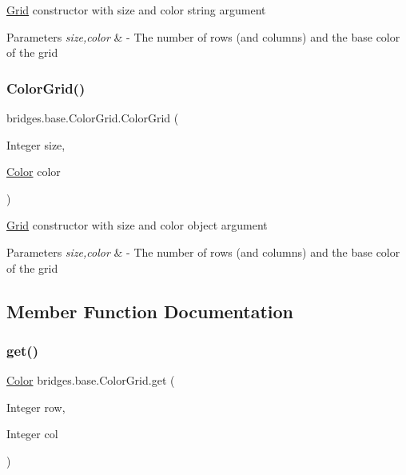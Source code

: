 \mbox{\hyperlink{classbridges_1_1base_1_1_grid}{Grid}} constructor with size and color string argument


\begin{DoxyParams}{Parameters}
{\em size,color} & -\/ The number of rows (and columns) and the base color of the grid \\
\hline
\end{DoxyParams}
\mbox{\label{classbridges_1_1base_1_1_color_grid_a51e4fd5e2b0d1c467d5eaf6860b5264a}} 
\subsubsection{\texorpdfstring{Color\+Grid()}{ColorGrid()}\hspace{0.1cm}{\footnotesize\ttfamily [5/5]}}
{\footnotesize\ttfamily bridges.\+base.\+Color\+Grid.\+Color\+Grid (\begin{DoxyParamCaption}\item[{Integer}]{size,  }\item[{\mbox{\hyperlink{classbridges_1_1base_1_1_color}{Color}}}]{color }\end{DoxyParamCaption})}

\mbox{\hyperlink{classbridges_1_1base_1_1_grid}{Grid}} constructor with size and color object argument


\begin{DoxyParams}{Parameters}
{\em size,color} & -\/ The number of rows (and columns) and the base color of the grid \\
\hline
\end{DoxyParams}


\subsection{Member Function Documentation}
\mbox{\label{classbridges_1_1base_1_1_color_grid_a0ab67c85074cd22a2c78ec4ac8a3821e}} 
\subsubsection{\texorpdfstring{get()}{get()}}
{\footnotesize\ttfamily \mbox{\hyperlink{classbridges_1_1base_1_1_color}{Color}} bridges.\+base.\+Color\+Grid.\+get (\begin{DoxyParamCaption}\item[{Integer}]{row,  }\item[{Integer}]{col }\end{DoxyParamCaption})}

